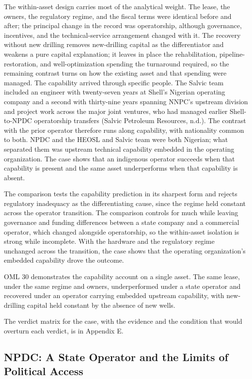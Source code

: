 The within-asset design carries most of the analytical weight. The
lease, the owners, the regulatory regime, and the fiscal terms were
identical before and after; the principal change in the record was
operatorship, although governance, incentives, and the technical-service
arrangement changed with it. The recovery without new drilling removes
new-drilling capital as the differentiator and weakens a pure capital
explanation; it leaves in place the rehabilitation,
pipeline-restoration, and well-optimization spending the turnaround
required, so the remaining contrast turns on how the existing asset and
that spending were managed. The capability arrived through specific
people. The Salvic team included an engineer with twenty-seven years at
Shell's Nigerian operating company and a second with thirty-nine years
spanning NNPC's upstream division and project work across the major
joint ventures, who had managed earlier Shell-to-NPDC operatorship
transfers (Salvic Petroleum Resources, n.d.). The contrast with the
prior operator therefore runs along capability, with nationality common
to both. NPDC and the HEOSL and Salvic team were both Nigerian; what
separated them was upstream technical capability embedded in the
operating organization. The case shows that an indigenous operator
succeeds when that capability is present and the same asset
underperforms when that capability is absent.

The comparison tests the capability prediction in its sharpest form and
rejects regulatory inadequacy as the differentiating cause, since the
regime held constant across the operator transition. The comparison
controls for much while leaving governance and funding differences
between a state company and a commercial operator, which changed
alongside operatorship, so the within-asset isolation is strong while
incomplete. With the hardware and the regulatory regime unchanged across
the transition, the case shows that the operating organization's
embedded capability drove the outcome.

OML 30 demonstrates the capability account on a single asset. The same
lease, under the same regime and owners, underperformed under a state
operator and recovered under an operator carrying embedded upstream
capability, with new-drilling capital held constant by the absence of
new wells.

The verdict matrix for the case, with the evidence and the condition
that would overturn each verdict, is in Appendix E.

\hypertarget{npdc-a-state-operator-and-the-limits-of-political-access}{%
\subsection{NPDC: A State Operator and the Limits of Political
Access}\label{npdc-a-state-operator-and-the-limits-of-political-access}}

